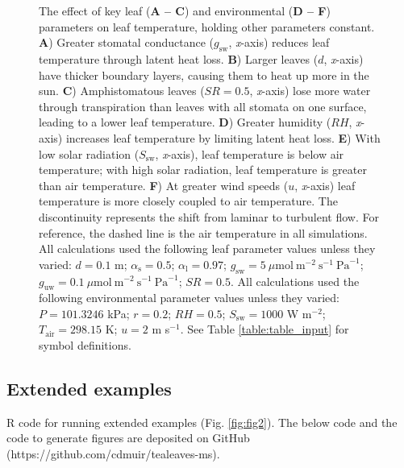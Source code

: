 \documentclass[11pt, oneside]{article}
\begin{document}
\begin{figure}[t!]
\caption{The effect of key leaf (\textbf{A -- C}) and environmental (\textbf{D -- F}) parameters on leaf temperature, holding other parameters constant. \textbf{A}) Greater stomatal conductance ($g_\mathrm{sw}$, \textit{x}-axis) reduces leaf temperature through latent heat loss. \textbf{B}) Larger leaves ($d$, \textit{x}-axis) have thicker boundary layers, causing them to heat up more in the sun. \textbf{C}) Amphistomatous leaves ($\mathit{SR} = 0.5$, \textit{x}-axis) lose more water through transpiration than leaves with all stomata on one surface, leading to a lower leaf temperature. \textbf{D}) Greater humidity ($\mathit{RH}$, \textit{x}-axis) increases leaf temperature by limiting latent heat loss. \textbf{E}) With low solar radiation ($S_\mathrm{sw}$, \textit{x}-axis), leaf temperature is below air temperature; with high solar radiation, leaf temperature is greater than air temperature. \textbf{F}) At greater wind speeds ($u$, \textit{x}-axis) leaf temperature is more closely coupled to air temperature. The discontinuity represents the shift from laminar to turbulent flow. For reference, the dashed line is the air temperature in all simulations. All calculations used the following leaf parameter values unless they varied: $d = 0.1$ m; $\alpha_\mathrm{s} = 0.5$; $\alpha_\mathrm{l} = 0.97$; $g_\mathrm{sw} = 5~\mu \textrm{mol}~\textrm{m} ^ {-2}~\textrm{s} ^ {-1}~\textrm{Pa} ^ {-1}$; $g_\mathrm{uw} = 0.1~\mu \textrm{mol}~\textrm{m} ^ {-2}~\textrm{s} ^ {-1}~\textrm{Pa} ^ {-1}$; $\mathit{SR} = 0.5$. All calculations used the following environmental parameter values unless they varied: $P = 101.3246$ kPa; $r = 0.2$; $\mathit{RH} = 0.5$; $S_\mathrm{sw} = 1000$ W m$^{-2}$; $T_\mathrm{air} = 298.15$ K; $u = 2$ m s$^{-1}$. See Table \ref{table:table_input} for symbol definitions.}
\label{fig:figS1}
\end{figure}

\clearpage


\subsection*{Extended examples}

R code for running extended examples (Fig. \ref{fig:fig2}). The below code and the code to generate figures are deposited on GitHub (https://github.com/cdmuir/tealeaves-ms).
 
\end{document}
